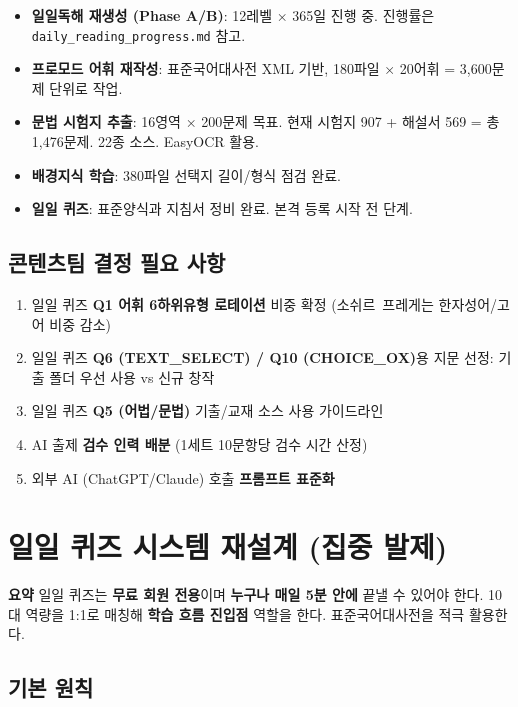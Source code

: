 \documentclass[11pt,a4paper]{article}
\newcommand{\summarybox}[1]{%
  \vspace{0.2cm}
  \noindent\colorbox{lightbg}{\parbox{\dimexpr\textwidth-2\fboxsep}{%
    \textbf{\color{korfarm}요약} \quad #1%
  }}
  \vspace{0.2cm}
}
\begin{document}
\begin{itemize}
  \item \textbf{일일독해 재생성 (Phase A/B)}: 12레벨 × 365일 진행 중. 진행률은 \texttt{daily\_reading\_progress.md} 참고.
  \item \textbf{프로모드 어휘 재작성}: 표준국어대사전 XML 기반, 180파일 × 20어휘 = 3,600문제 단위로 작업.
  \item \textbf{문법 시험지 추출}: 16영역 × 200문제 목표. 현재 시험지 907 + 해설서 569 = 총 1,476문제. 22종 소스. EasyOCR 활용.
  \item \textbf{배경지식 학습}: 380파일 선택지 길이/형식 점검 완료.
  \item \textbf{일일 퀴즈}: 표준양식과 지침서 정비 완료. 본격 등록 시작 전 단계.
\end{itemize}

\subsection{콘텐츠팀 결정 필요 사항}

\begin{enumerate}
  \item 일일 퀴즈 \textbf{Q1 어휘 6하위유형 로테이션} 비중 확정 (소쉬르~프레게는 한자성어/고어 비중 감소)
  \item 일일 퀴즈 \textbf{Q6 (TEXT\_SELECT) / Q10 (CHOICE\_OX)}용 지문 선정: 기출 폴더 우선 사용 vs 신규 창작
  \item 일일 퀴즈 \textbf{Q5 (어법/문법)} 기출/교재 소스 사용 가이드라인
  \item AI 출제 \textbf{검수 인력 배분} (1세트 10문항당 검수 시간 산정)
  \item 외부 AI (ChatGPT/Claude) 호출 \textbf{프롬프트 표준화}
\end{enumerate}

\newpage
\section{일일 퀴즈 시스템 재설계 (집중 발제)}

\summarybox{일일 퀴즈는 \textbf{무료 회원 전용}이며 \textbf{누구나 매일 5분 안에} 끝낼 수 있어야 한다. 10대 역량을 1:1로 매칭해 \textbf{학습 흐름 진입점} 역할을 한다. 표준국어대사전을 적극 활용한다.}

\subsection{기본 원칙}
\end{document}
